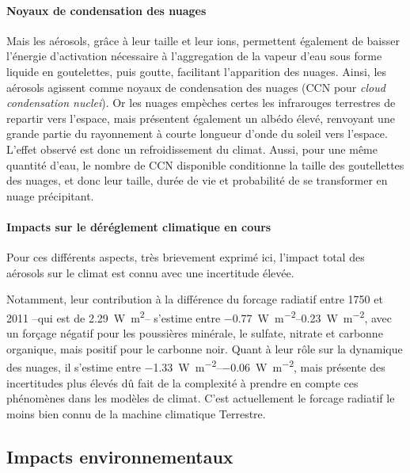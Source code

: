 \paragraph{Noyaux de condensation des nuages}%
\label{par:noyaux_de_condensation_des_nuages}

Mais les aérosols, grâce à leur taille et leur ions, permettent également de baisser
l'énergie d'activation nécessaire à l'aggregation de la vapeur d'eau sous forme liquide en
goutelettes, puis goutte, facilitant l'apparition des nuages. Ainsi, les aérosols agissent
comme noyaux de condensation des nuages (CCN pour \textit{cloud condensation nuclei}). Or
les nuages empèches certes les infrarouges terrestres de repartir vers l'espace, mais
présentent également un albédo élevé, renvoyant une grande partie du rayonnement à courte
longueur d'onde du soleil vers l'espace. L'effet observé est donc un refroidissement du
climat.
Aussi, pour une même quantité d'eau, le nombre de CCN disponible conditionne la taille des
goutellettes des nuages, et donc leur taille, durée de vie et probabilité de se
transformer en nuage précipitant.

\paragraph{Impacts sur le déréglement climatique en cours}%
\label{par:impacts_sur_le_dereglement_climatique_en_cours}

Pour ces différents aspects, très brievement exprimé ici, l'impact total des aérosols sur
le climat est connu avec une incertitude élevée. 

Notamment, leur contribution à la différence du forcage radiatif entre 1750 et 2011 --qui
est de \SI{2.29}{\W\m\squared}-- s'estime entre
\SIrange[range-phrase=~et~]{-0.77}{0.23}{\W\per\m\squared}, avec un forçage négatif pour
les poussières minérale, le sulfate, nitrate et carbonne organique, mais positif pour le
carbonne noir.  Quant à leur rôle sur la dynamique des nuages, il s'estime entre
\SIrange[range-phrase=~et~]{-1.33}{-0.06}{\W\per\m\squared}, mais présente des
incertitudes plus élevés dû fait de la complexité à prendre en compte ces phénomènes dans
les modèles de climat. C'est actuellement le forcage radiatif le moins bien connu de la
machine climatique Terrestre.

\subsection{Impacts environnementaux}%
\label{sub:impacts_environnementaux}

